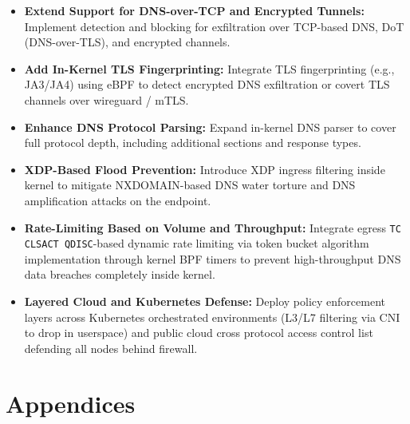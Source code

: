 \documentclass [11pt, proquest] {uwthesis}[2020/02/24]
\begin{document}
\begin{itemize}[itemsep=1pt,parsep=0pt]
  \item \textbf{Extend Support for DNS-over-TCP and Encrypted Tunnels:} Implement detection and blocking for exfiltration over TCP-based DNS, DoT (DNS-over-TLS), and encrypted channels.

  \item \textbf{Add In-Kernel TLS Fingerprinting:} Integrate TLS fingerprinting (e.g., JA3/JA4) using eBPF to detect encrypted DNS exfiltration or covert TLS channels over wireguard / mTLS.

  \item \textbf{Enhance DNS Protocol Parsing:} Expand in-kernel DNS parser to cover full protocol depth, including additional sections and response types.


  \item \textbf{XDP-Based Flood Prevention:} Introduce XDP ingress filtering inside kernel to mitigate NXDOMAIN-based DNS water torture and DNS amplification attacks on the endpoint.

  \item \textbf{Rate-Limiting Based on Volume and Throughput:} Integrate egress \texttt{TC CLSACT QDISC}-based dynamic rate limiting via token bucket algorithm implementation through kernel BPF timers to prevent high-throughput DNS data breaches completely inside kernel.

  \item \textbf{Layered Cloud and Kubernetes Defense:} Deploy policy enforcement layers across Kubernetes orchestrated environments (L3/L7 filtering via CNI to drop in userspace) and public cloud cross protocol access control list defending all nodes behind firewall.

\end{itemize}



\chapter{Appendices}
\end{document}
